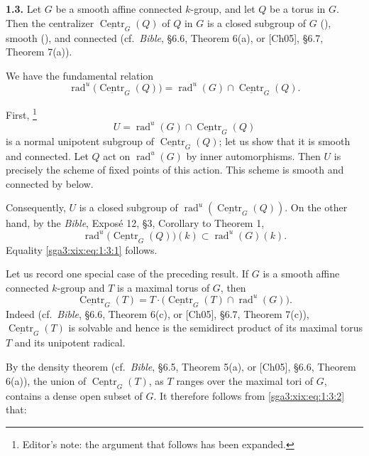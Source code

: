 \noindent{}\textbf{1.3.}\quad
Let \(G\) be a smooth affine connected \(k\)-group, and let \(Q\) be a torus
in \(G\).  Then the centralizer
\(\underline{\operatorname{Centr}}_{G}(Q)\) of \(Q\) in \(G\) is a closed
subgroup of \(G\) (), smooth (), and connected
(cf.\ \emph{Bible}, §6.6, Theorem 6(a), or [Ch05], §6.7, Theorem 7(a)).

We have the fundamental relation
\begin{equation}
  \operatorname{rad}^{u}\!\bigl(\underline{\operatorname{Centr}}_{G}(Q)\bigr)
  =
  \operatorname{rad}^{u}(G)\cap
  \underline{\operatorname{Centr}}_{G}(Q).
  \tag{1.3.1}\label{sga3:xix:eq:1:3:1}
\end{equation}

First,%
\footnote{Editor's note: the argument that follows has been expanded.}
\[
  U=\operatorname{rad}^{u}(G)\cap
  \underline{\operatorname{Centr}}_{G}(Q)
\]
is a normal unipotent subgroup of
\(\underline{\operatorname{Centr}}_{G}(Q)\); let us show that it is smooth
and connected.  Let \(Q\) act on \(\operatorname{rad}^{u}(G)\) by inner
automorphisms.  Then \(U\) is precisely the scheme of fixed points of this
action.  This scheme is smooth and connected by  below.

Consequently, \(U\) is a closed subgroup of
\(\operatorname{rad}^{u}(\underline{\operatorname{Centr}}_{G}(Q))\).
On the other hand, by the \emph{Bible}, Exposé 12, §3, Corollary to
Theorem 1,
\[
  \operatorname{rad}^{u}\!\bigl(
    \underline{\operatorname{Centr}}_{G}(Q)\bigr)(k)
  \subset
  \operatorname{rad}^{u}(G)(k).
\]
Equality \eqref{sga3:xix:eq:1:3:1} follows.

Let us record one special case of the preceding result.  If \(G\) is a smooth
affine connected \(k\)-group and \(T\) is a maximal torus of \(G\), then
\begin{equation}
  \underline{\operatorname{Centr}}_{G}(T)
  =
  T\cdot\bigl(
    \underline{\operatorname{Centr}}_{G}(T)\cap
    \operatorname{rad}^{u}(G)\bigr).
  \tag{1.3.2}\label{sga3:xix:eq:1:3:2}
\end{equation}
Indeed (cf.\ \emph{Bible}, §6.6, Theorem 6(c), or [Ch05], §6.7,
Theorem 7(c)), \(\underline{\operatorname{Centr}}_{G}(T)\) is solvable and
hence is the semidirect product of its maximal torus \(T\) and its unipotent
radical.

By the density theorem (cf.\ \emph{Bible}, §6.5, Theorem 5(a), or [Ch05],
§6.6, Theorem 6(a)), the union of
\(\underline{\operatorname{Centr}}_{G}(T)\), as \(T\) ranges over the
maximal tori of \(G\), contains a dense open subset of \(G\).  It therefore
follows from \eqref{sga3:xix:eq:1:3:2} that:

